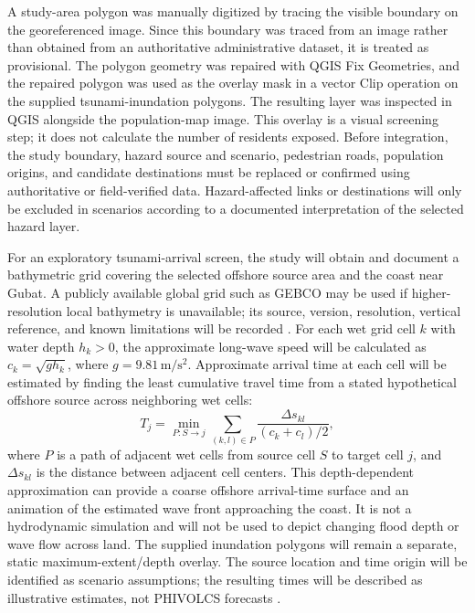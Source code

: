 \documentclass[conference]{IEEEtran}
\begin{document}
A study-area polygon was manually digitized by tracing the visible boundary on the georeferenced image. Since this boundary was traced from an image rather than obtained from an authoritative administrative dataset, it is treated as provisional. The polygon geometry was repaired with QGIS Fix Geometries, and the repaired polygon was used as the overlay mask in a vector Clip operation on the supplied tsunami-inundation polygons. The resulting layer was inspected in QGIS alongside the population-map image. This overlay is a visual screening step; it does not calculate the number of residents exposed. Before integration, the study boundary, hazard source and scenario, pedestrian roads, population origins, and candidate destinations must be replaced or confirmed using authoritative or field-verified data. Hazard-affected links or destinations will only be excluded in scenarios according to a documented interpretation of the selected hazard layer.

For an exploratory tsunami-arrival screen, the study will obtain and document a bathymetric grid covering the selected offshore source area and the coast near Gubat. A publicly available global grid such as GEBCO may be used if higher-resolution local bathymetry is unavailable; its source, version, resolution, vertical reference, and known limitations will be recorded \cite{gebco}. For each wet grid cell $k$ with water depth $h_k>0$, the approximate long-wave speed will be calculated as $c_k=\sqrt{g h_k}$, where $g=9.81\,\mathrm{m/s^2}$. Approximate arrival time at each cell will be estimated by finding the least cumulative travel time from a stated hypothetical offshore source across neighboring wet cells:
\begin{equation}
T_j = \min_{P:S\rightarrow j}\sum_{(k,l)\in P}\frac{\Delta s_{kl}}{(c_k+c_l)/2},
\end{equation}
where $P$ is a path of adjacent wet cells from source cell $S$ to target cell $j$, and $\Delta s_{kl}$ is the distance between adjacent cell centers. This depth-dependent approximation can provide a coarse offshore arrival-time surface and an animation of the estimated wave front approaching the coast. It is not a hydrodynamic simulation and will not be used to depict changing flood depth or wave flow across land. The supplied inundation polygons will remain a separate, static maximum-extent/depth overlay. The source location and time origin will be identified as scenario assumptions; the resulting times will be described as illustrative estimates, not PHIVOLCS forecasts \cite{noaaprop}.
\end{document}

